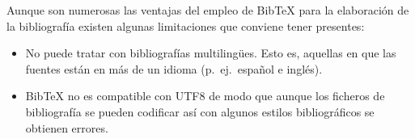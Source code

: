 \documentclass[11pt,a4paper]{article}
\begin{document}
Aunque son numerosas las ventajas del empleo de Bib\TeX{} para la elaboración de la bibliografía existen algunas limitaciones que conviene tener presentes:
\begin{itemize}
	\item No puede tratar con bibliografías multilingües. Esto es, aquellas en que las fuentes están en más de un idioma (p.~ej.\ español e inglés).
	
	\item Bib\TeX{} no es compatible con UTF8 de modo que aunque los ficheros de bibliografía se pueden codificar así con algunos estilos bibliográficos se obtienen errores.
\end{itemize}





\renewcommand{\refname}{Bibliografía} %

%
%

%
% 


\end{document}
